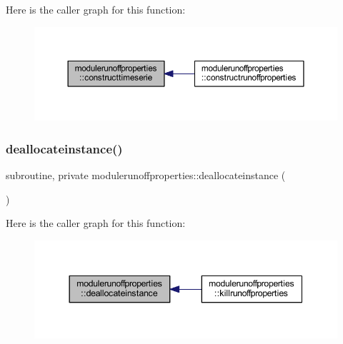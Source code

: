 Here is the caller graph for this function\+:\nopagebreak
\begin{figure}[H]
\begin{center}
\leavevmode
\includegraphics[width=350pt]{namespacemodulerunoffproperties_a00eb7dbee6a76f3b846621e0aad282c0_icgraph}
\end{center}
\end{figure}
\mbox{\label{namespacemodulerunoffproperties_a8f7e7b0e3044653a0ff4aaf8ecc56c65}} 
\subsubsection{\texorpdfstring{deallocateinstance()}{deallocateinstance()}}
{\footnotesize\ttfamily subroutine, private modulerunoffproperties\+::deallocateinstance (\begin{DoxyParamCaption}{ }\end{DoxyParamCaption})\hspace{0.3cm}{\ttfamily [private]}}

Here is the caller graph for this function\+:\nopagebreak
\begin{figure}[H]
\begin{center}
\leavevmode
\includegraphics[width=344pt]{namespacemodulerunoffproperties_a8f7e7b0e3044653a0ff4aaf8ecc56c65_icgraph}
\end{center}
\end{figure}
\mbox{\label{namespacemodulerunoffproperties_a5f6b0b75ea06dc86390d8f5059e913a5}} 
